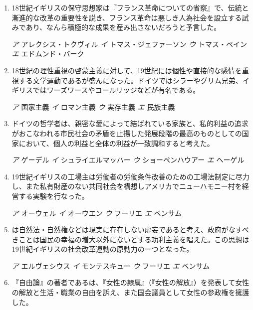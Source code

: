 \documentclass[uplatex,dvipdfmx]{jsarticle}
\newcommand{\sentakusi}[4]{
\hspace{.3zw}
\emph{ア}\hspace{1zw} #1 \hspace{2zw} \emph{イ} \hspace{1zw}#2 \hspace{2zw}\emph{ウ}\hspace{1zw} #3 \hspace{2zw}\emph{エ}\hspace{1zw} #4

}
\begin{document}
\begin{enumerate}
\sentakusi
{カント}
{シェリング}
{ヘーゲル}
{フィヒテ}


\item   18世紀イギリスの保守思想家は『フランス革命についての省察』で、伝統と漸進的な改革の重要性を説き、フランス革命は悪しき人為社会を設立する試みであり、なんら積極的な成果を産み出さないだろうと予言した。

\sentakusi
{アレクシス・トクヴィル}
{トマス・ジェファーソン}
{トマス・ペイン}
{エドムンド・バーク}





\item   18世紀の理性重視の啓蒙主義に対して、19世紀には個性や直接的な感情を重視する文学運動であるが盛んになった。ドイツではシラーやグリム兄弟、イギリスではワーズワースやコールリッジなどが有名である。

\sentakusi
{国家主義}
{ロマン主義}
{実存主義}
{民族主義}

\item   ドイツの哲学者は、親密な愛によって結ばれている家族と、私的利益の追求がおこなわれる市民社会の矛盾を止揚した発展段階の最高のものとしての国家において、個人の利益と全体の利益が一致調和すると考えた。

\sentakusi
{ゲーデル}
{シュライエルマッハー}
{ショーペンハウアー}
{ヘーゲル}

\item   19世紀イギリスの工場主は労働者の労働条件改善のための工場法制定に尽力し、また私有財産のない共同社会を構想しアメリカでニューハモニー村を経営する実験を行なった。

\sentakusi
{オーウェル}
{オーウエン}
{フーリエ}
{ベンサム}

\item {}は自然法・自然権などは現実に存在しない虚妄であると考え、政府がなすべきことは国民の幸福の増大以外にないとする功利主義を唱えた。この思想は19世紀イギリスの社会改革運動の原動力の一つとなった。

\sentakusi
{エルヴェシウス}
{モンテスキュー}
{フーリエ}
{ベンサム}

\item 『自由論』の著者であるは、『女性の隷属』（『女性の解放』）を発表して女性の解放と生活・職業の自由を訴え、また国会議員として女性の参政権を擁護した。


\end{enumerate}
\end{document}
